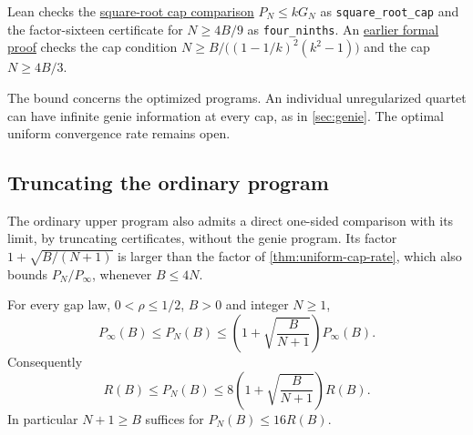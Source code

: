 Lean checks the
\href{https://github.com/davidiach/adaptive-threshold-estimation/blob/f1425008ea71094d900b8cbb9a90b485f0884d33/lean/ThresholdHC/SquareRootCap/Full.lean}{square-root cap comparison}
$P_N\le kG_N$ as \texttt{square\_root\_cap} and the factor-sixteen
certificate for $N\ge4B/9$ as \texttt{four\_ninths}. An
\href{https://github.com/davidiach/adaptive-threshold-estimation/blob/537543ca0ea813d9eecbc165b0e4af1beb71a06e/lean/ThresholdHC/GenieRate/Full.lean}{earlier formal proof}
checks the cap condition $N\ge B/\bigl((1-1/k)^2(k^2-1)\bigr)$ and the cap
$N\ge4B/3$.

The bound concerns the optimized programs. An individual unregularized
quartet can have infinite genie information at every cap, as in
\cref{sec:genie}. The optimal uniform convergence rate remains open.

\clearpage
\subsection{Truncating the ordinary program}

The ordinary upper program also admits a direct one-sided comparison with
its limit, by truncating certificates, without the genie program. Its
factor $1+\sqrt{B/(N+1)}$ is larger than the factor of
\cref{thm:uniform-cap-rate}, which also bounds $P_N/P_\infty$, whenever
$B\le4N$.

\begin{theorem}\label{thm:ordinary-cap-rate}
For every gap law, $0<\rho\le1/2$, $B>0$ and integer $N\ge1$,
\[
 P_\infty(B)\le P_N(B)\le
 \left(1+\sqrt{\frac{B}{N+1}}\right)P_\infty(B).
\]
Consequently
\[
 R(B)\le P_N(B)\le
 8\left(1+\sqrt{\frac{B}{N+1}}\right)R(B).
\]
In particular $N+1\ge B$ suffices for $P_N(B)\le16R(B)$.
\end{theorem}

